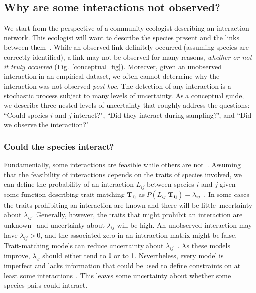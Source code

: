 \documentclass[12pt]{article}
\begin{document}
\begin{spacing}{2.0}
    \subsection*{Why are some interactions not observed?}

      We start from the perspective of a community ecologist describing an interaction network. This ecologist will want to describe the species present and the links between them~\citep{Roslin2016}. While an observed link definitely occurred (assuming species are correctly identified), a link may not be observed for many reasons, \emph{whether or not it truly occurred} (Fig.~\ref{conceptual_fig}). Moreover, given an unobserved interaction in an empirical dataset, we often cannot determine why the interaction was not observed \emph{post hoc}. The detection of any interaction is a stochastic process subject to many levels of uncertainty. As a conceptual guide, we describe three nested levels of uncertainty that roughly address the questions: ``Could species $i$ and $j$ interact?", ``Did they interact during sampling?", and ``Did we observe the interaction?"


        \subsubsection*{Could the species interact?} 

          Fundamentally, some interactions are feasible while others are not~\citep{Poisot2015}. Assuming that the feasibility of interactions depends on the traits of species involved, we can define the probability of an interaction $L_{ij}$ between species $i$ and $j$ given some function describing trait matching $\mathbf{T_{ij}}$ as $P(L_{ij}|\mathbf{T_{ij}})=\lambda_{ij}$~\citep{Bartomeus2013,Gravel2013,Weinstein2017}. In some cases the traits prohibiting an interaction are known and there will be little uncertainty about $\lambda_{ij}$. Generally, however, the traits that might prohibit an interaction are unknown~\citep{Dormann2017} and uncertainty about $\lambda_{ij}$ will be high. 
          An unobserved interaction may have $\lambda_{ij}>0$, and the associated zero in an interaction matrix might be false. Trait-matching models can reduce uncertainty about $\lambda_{ij}$~\citep{Jordano2016}. As these models improve, $\lambda_{ij}$ should either tend to 0 or to 1. Nevertheless, every model is imperfect and lacks information that could be used to define constraints on at least some interactions~\citep{Dormann2017}. This leaves some uncertainty about whether some species pairs could interact.



\end{spacing}
\end{document}
